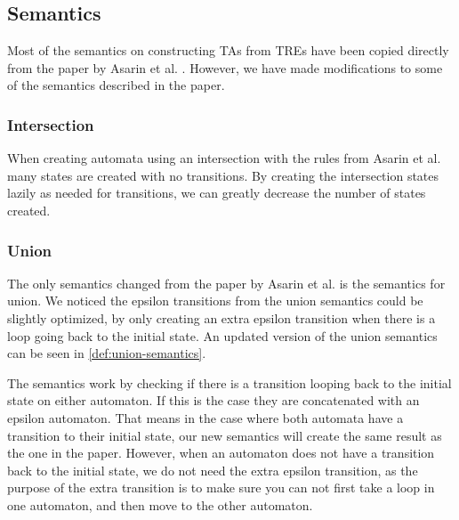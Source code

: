 \subsection{Semantics}\label{subsec:semantics}
\begin{comment}
    Where do most of our semantics come from?
    
    Intersection semantics
     - Motivation

    Describe union semantics
     - Motivation
     - New definition
     - Visual change
    
    Describe MatchAny semantics
     - Motivation
     - Definition
     - Visual
\end{comment}

Most of the semantics on constructing TAs from TREs have been copied directly from the paper by Asarin et al. \cite{Eugene2001}. However, we have made modifications to some of the semantics described in the paper.

\subsubsection{Intersection}
When creating automata using an intersection with the rules from Asarin et al.
many states are created with no transitions.
By creating the intersection states lazily as needed for transitions, we can greatly decrease the number of states created.

\subsubsection{Union}
The only semantics changed from the paper by Asarin et al. is the semantics for union.
We noticed the epsilon transitions from the union semantics could be slightly optimized, by only creating an extra epsilon transition when there is a loop going back to the initial state.
An updated version of the union semantics can be seen in \cref{def:union-semantics}.



The semantics work by checking if there is a transition looping back to the initial state on either automaton.
If this is the case they are concatenated with an epsilon automaton.
That means in the case where both automata have a transition to their initial state, our new semantics will create the same result as the one in the paper.
However, when an automaton does not have a transition back to the initial state, we do not need the extra epsilon transition, as the purpose of the extra transition is to make sure you can not first take a loop in one automaton, and then move to the other automaton.


